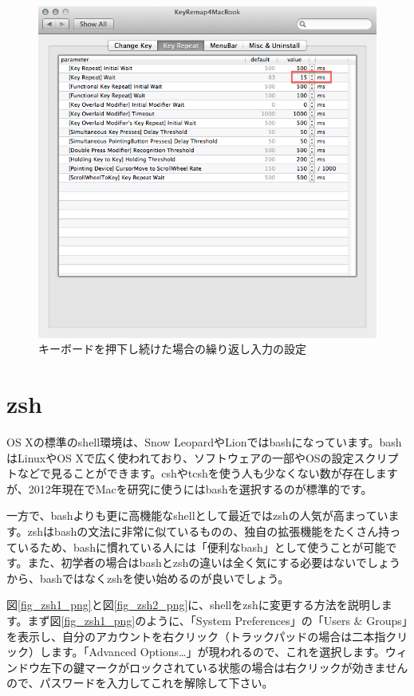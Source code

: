 \begin{figure}
  \centering
  \includegraphics[scale=0.35]{fig/KeyRemap4MacBook2.png}
  \caption{キーボードを押下し続けた場合の繰り返し入力の設定}
  \label{fig_KeyRemap4MacBook2_png}
\end{figure}

\section{zsh}

OS Xの標準のshell環境は、Snow LeopardやLionではbashになっています。bashはLinuxやOS Xで広く使われており、ソフトウェアの一部やOSの設定スクリプトなどで見ることができます。cshやtcshを使う人も少なくない数が存在しますが、2012年現在でMacを研究に使うにはbashを選択するのが標準的です。

一方で、bashよりも更に高機能なshellとして最近ではzshの人気が高まっています。zshはbashの文法に非常に似ているものの、独自の拡張機能をたくさん持っているため、bashに慣れている人には「便利なbash」として使うことが可能です。また、初学者の場合はbashとzshの違いは全く気にする必要はないでしょうから、bashではなくzshを使い始めるのが良いでしょう。

図\ref{fig_zsh1_png}と図\ref{fig_zsh2_png}に、shellをzshに変更する方法を説明します。まず図\ref{fig_zsh1_png}のように、「System Preferences」の「Users \& Groups」を表示し、自分のアカウントを右クリック（トラックパッドの場合は二本指クリック）します。「Advanced Options\ldots」が現われるので、これを選択します。ウィンドウ左下の鍵マークがロックされている状態の場合は右クリックが効きませんので、パスワードを入力してこれを解除して下さい。

